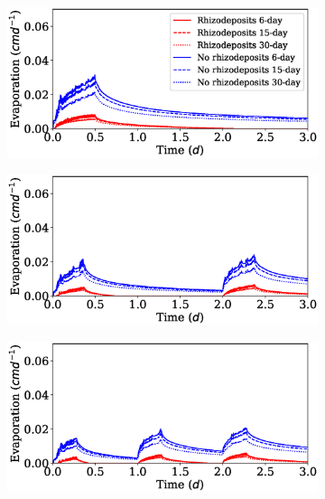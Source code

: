 \documentclass[11pt,a4paper]{article}
\numberwithin{equation}{section}
\begin{document}
\begin{figure}
	\begin{subfigure}{0.32\textwidth}
		\includegraphics[width = \linewidth, keepaspectratio] {ev_ppat1ptot0_12.eps}
		\caption{}
	\end{subfigure}
	\begin{subfigure}{0.32\textwidth}
		\includegraphics[width = \linewidth, keepaspectratio] {ev_ppat2ptot0_12.eps}
		\caption{}
	\end{subfigure}
	\begin{subfigure}{0.32\textwidth}
		\includegraphics[width = \linewidth, keepaspectratio] {ev_ppat3ptot0_12.eps}
		\caption{}
	\end{subfigure}\\

\end{figure}
\end{document}
